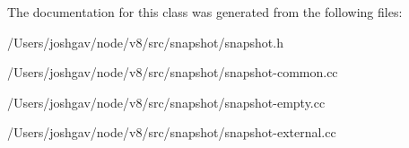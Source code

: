 The documentation for this class was generated from the following files\+:\begin{DoxyCompactItemize}
\item 
/\+Users/joshgav/node/v8/src/snapshot/snapshot.\+h\item 
/\+Users/joshgav/node/v8/src/snapshot/snapshot-\/common.\+cc\item 
/\+Users/joshgav/node/v8/src/snapshot/snapshot-\/empty.\+cc\item 
/\+Users/joshgav/node/v8/src/snapshot/snapshot-\/external.\+cc\end{DoxyCompactItemize}
